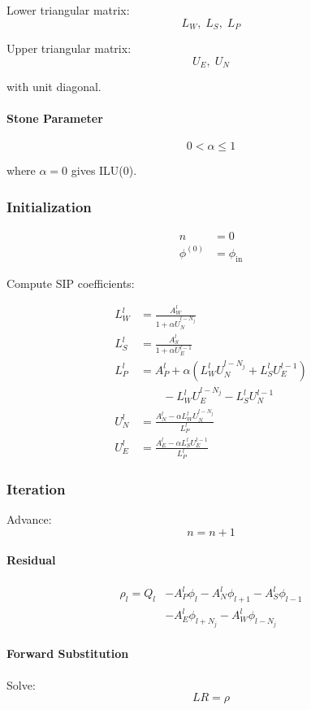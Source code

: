 \documentclass[11pt]{article}
\begin{document}
Lower triangular matrix:
\[
L_W,\;L_S,\;L_P
\]

Upper triangular matrix:
\[
U_E,\;U_N
\]

with unit diagonal.

\paragraph{Stone Parameter}

\[
0 < \alpha \le 1
\]

where $\alpha=0$ gives ILU(0).

\subsubsection{Initialization}

\begin{align*}
n &= 0 \\
\phi^{(0)} &= \phi_{\text{in}}
\end{align*}

Compute SIP coefficients:

\begin{align*}
L_W^l
&=
\frac{A_W^l}
     {1+\alpha U_N^{l-N_j}}
\\
L_S^l
&=
\frac{A_S^l}
     {1+\alpha U_E^{l-1}}
\\
L_P^l
&=
A_P^l
+\alpha
\left(
L_W^l U_N^{l-N_j}
+
L_S^l U_E^{l-1}
\right)
\\
&\qquad
-
L_W^l U_E^{l-N_j}
-
L_S^l U_N^{l-1}
\\
U_N^l
&=
\frac{
A_N^l
-\alpha L_W^l U_N^{l-N_j}
}
{L_P^l}
\\
U_E^l
&=
\frac{
A_E^l
-\alpha L_S^l U_E^{l-1}
}
{L_P^l}
\end{align*}

\subsubsection{Iteration}

Advance:
\[
n=n+1
\]

\paragraph{Residual}
\begin{align*}
\rho_l
=
Q_l
&-A_P^l\phi_l
-A_N^l\phi_{l+1}
-A_S^l\phi_{l-1}
\\
&-A_E^l\phi_{l+N_j}
-A_W^l\phi_{l-N_j}
\end{align*}

\paragraph{Forward Substitution}
Solve:
\[
LR=\rho
\]
\end{document}
